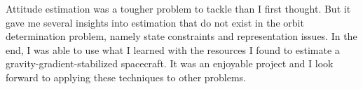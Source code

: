 \documentclass[]{aiaa-tc}%
\begin{document}
	\vspace{5 mm}

Attitude estimation was a tougher problem to tackle than I first thought. But it gave me several insights into estimation that do not exist in the orbit determination problem, namely state constraints and representation issues. In the end, I was able to use what I learned with the resources I found to estimate a gravity-gradient-stabilized spacecraft. It was an enjoyable project and I look forward to applying these techniques to other problems.



%    
    
%    
%    
%    
%
%
%
%
	
\end{document}
